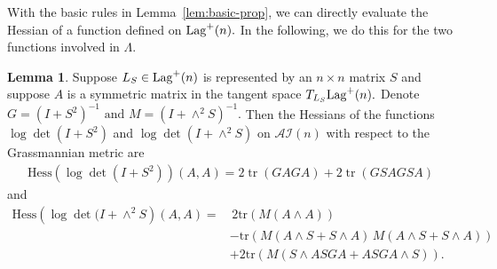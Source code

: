 \documentclass[11pt]{amsart}
\numberwithin{equation}{section}
\theoremstyle{definition}
\theoremstyle{definition}
\newtheorem{lemma}[equation]{Lemma}
\newcommand{\pr}[1]{\left(#1\right)}
\newcommand{\tr}{\text{tr}}
\newcommand{\Hess}{\text{Hess}}
\begin{document}
With the basic rules in Lemma~\ref{lem:basic-prop}, we can directly evaluate the Hessian of a function defined on ${\rm Lag}^+(n).$
In the following, we do this for the two functions involved in $\Lambda.$


\begin{lemma}
	\label{lem:first-expansion}
	Suppose $L_S\in{\rm Lag}^+(n)$ is represented by an $n\times n$ matrix $S$ and suppose $A$ is a symmetric matrix in the tangent space $T_{L_S}{\rm Lag}^+(n).$ 
	Denote
	$G = (I + S^2)^{-1}
	\text{ and }
	M = (I + \wedge^2 S)^{-1}.$
	Then the Hessians of the functions $\log \det (I + S^2)$ and $\log \det (I + \wedge^2 S)$ on $\mathcal{AI}(n)$ with respect to the Grassmannian metric are
	\begin{align}\label{Hess-Omega}
	\Hess \pr{\log \det (I + S^2)} (A, A)
	= 2 \operatorname{tr}(G A G A) + 2 \operatorname{tr}(G S A G S A)
	\end{align}
	and
	\begin{equation}\label{Hess-Lambda-first}
	\begin{split}
	\Hess \pr{\log \det (I+\wedge^2 S}(A,A)
	= & \, 2\tr \pr{M (A \wedge A) }\\
	& - \tr\pr{M (A \wedge S + S \wedge A) \, M (A \wedge S + S \wedge A) }\\
	& + 2\tr\pr{M \pr{S\wedge ASGA + ASGA \wedge S}}.
	\end{split}
	\end{equation}
\end{lemma}
\end{document}
